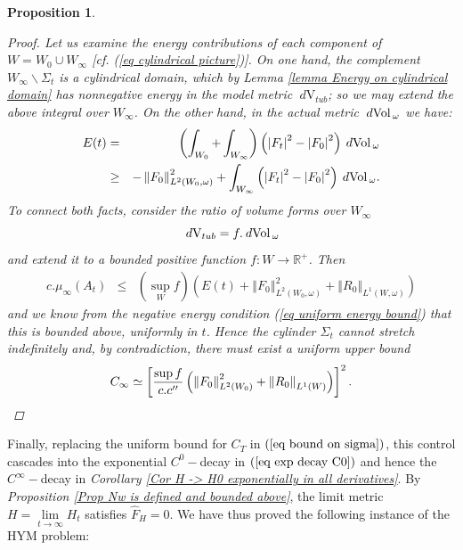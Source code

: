 \documentclass{article}
\newcommand{\func}[1]{\textnormal {#1\,}}
\newcommand{\R}{\mathbb{R}}
\newcommand{\dvol}{\:d\func{Vol}_\omega}
\newcommand{\dvtub}{\:d\text{V}_{tub}}
\newtheorem{proposition}[theorem]{Proposition}
\begin{document}
\begin{proposition}
\begin{proof}
 Let us examine the energy contributions of each component of $W=W_0\cup W_\infty$ [cf. (\ref{eq cylindrical picture})]. On one hand, the complement $W_\infty\smallsetminus\Sigma_t$ is a cylindrical domain, which by \emph{Lemma \ref{lemma Energy on cylindrical domain}}  has nonnegative energy in the model metric $\dvtub$; so we may extend the above integral over $W_\infty$. On the other hand, in the actual metric $\dvol$ we have:
\begin{eqnarray*}
        E(t)&=&\left(\int_{W_0}+\int_{W_\infty} \right)
        \left(\left\vert F_t\right\vert^2
        - \left\vert F_0 \right\vert^2 \right) 
        \dvol\\
        &\geq&
       -\left\Vert F_0\right\Vert^2 _{L^2(W_0,\omega)} 
        + \int_{W_\infty}
        \left(\left\vert F_t\right\vert^2
        - \left\vert F_0 \right\vert^2\right) 
        \dvol.
\end{eqnarray*}
To connect both facts, consider the ratio of volume forms
over $W_\infty$
$$
\dvtub=f.\dvol
$$
and extend it to a  bounded positive function $f:W\to\R^+$. Then 
\begin{eqnarray*}
        c.\mu_{\infty}\left( A_t \right) 
        &\leq& \left(\sup_W f\right)\left(E(t)
        +\left\Vert F_0\right\Vert^2 _{L^2(W_0,\omega)} 
        +\left\Vert R_{0}\right\Vert_{L^1(W,\omega)}\right)
\end{eqnarray*}
 and we know from the negative energy condition (\ref{eq uniform energy bound}) that this is bounded above, uniformly in $t$. Hence the cylinder $\Sigma_t$ cannot stretch indefinitely and, by contradiction, there must exist a uniform upper bound$$ 
C_\infty \simeq 
\left[
\frac
{\sup f} 
{c.c''}
\left(\left\Vert F_0\right\Vert^2 _{L^2(W_0)} 
+\left\Vert R_{0}\right\Vert_{L^1(W)}
\right)
\right]^2.\qedhere
$$
\end{proof}
\end{proposition}

Finally, replacing the uniform bound for $C_T$     in $\left(\ref{eq bound on sigma} \right)$,  this control cascades into the exponential $C^0-$decay in $\left( \ref{eq exp decay C0} \right)$ and hence the $C^\infty-$decay in \emph{Corollary \ref{Cor H -> H0 exponentially in all derivatives}}. By \emph{Proposition \ref{Prop Nw is defined and bounded above}}, the limit metric $H=\lim\limits_{t\rightarrow\infty}H_t$ satisfies $\hat F_H=0$. We have thus proved the following instance of the HYM problem:
\end{document}
